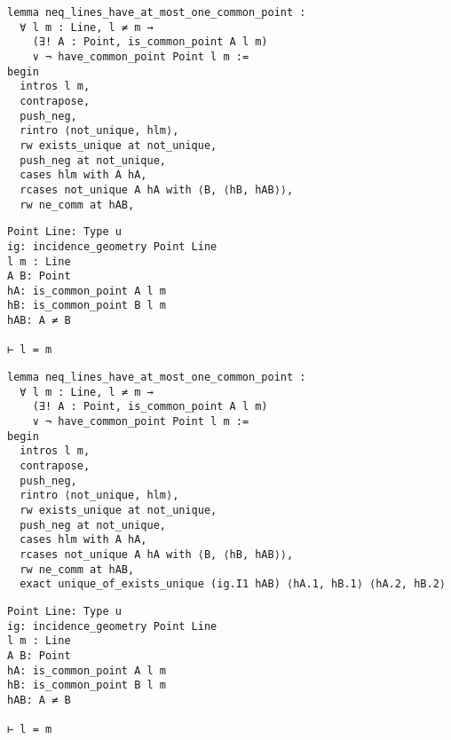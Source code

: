 \begin{frame}[fragile]
	\begin{multicols}{2}
		\begin{lstlisting}
lemma neq_lines_have_at_most_one_common_point :
  ∀ l m : Line, l ≠ m → 
    (∃! A : Point, is_common_point A l m) 
    ∨ ¬ have_common_point Point l m := 
begin
  intros l m,
  contrapose,
  push_neg,
  rintro ⟨not_unique, hlm⟩,
  rw exists_unique at not_unique,
  push_neg at not_unique,
  cases hlm with A hA,
  rcases not_unique A hA with ⟨B, ⟨hB, hAB⟩⟩,
  rw ne_comm at hAB,
\end{lstlisting}
		\columnbreak
		\begin{lstlisting}
Point Line: Type u
ig: incidence_geometry Point Line
l m : Line
A B: Point
hA: is_common_point A l m
hB: is_common_point B l m
hAB: A ≠ B

⊢ l = m
\end{lstlisting}
	\end{multicols}
\end{frame}










\begin{frame}[fragile]
	\begin{multicols}{2}
		\begin{lstlisting}
lemma neq_lines_have_at_most_one_common_point :
  ∀ l m : Line, l ≠ m → 
    (∃! A : Point, is_common_point A l m) 
    ∨ ¬ have_common_point Point l m := 
begin
  intros l m,
  contrapose,
  push_neg,
  rintro ⟨not_unique, hlm⟩,
  rw exists_unique at not_unique,
  push_neg at not_unique,
  cases hlm with A hA,
  rcases not_unique A hA with ⟨B, ⟨hB, hAB⟩⟩,
  rw ne_comm at hAB,
  exact unique_of_exists_unique (ig.I1 hAB) ⟨hA.1, hB.1⟩ ⟨hA.2, hB.2⟩
\end{lstlisting}
		\columnbreak
		\begin{lstlisting}
Point Line: Type u
ig: incidence_geometry Point Line
l m : Line
A B: Point
hA: is_common_point A l m
hB: is_common_point B l m
hAB: A ≠ B

⊢ l = m
\end{lstlisting}
	\end{multicols}
\end{frame}










